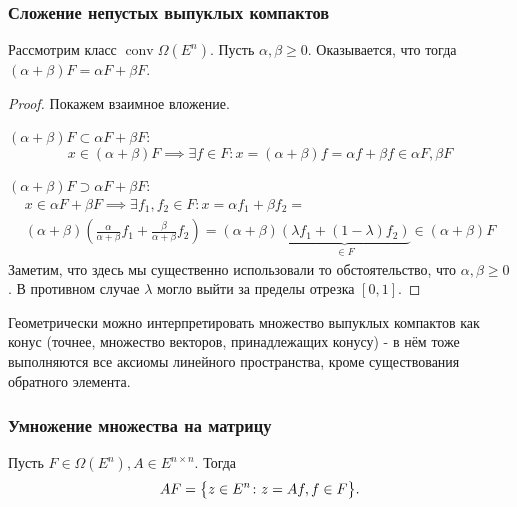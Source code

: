\subsubsection{Сложение непустых выпуклых компактов}
Рассмотрим класс $\operatorname{conv} \Omega(E^n)$.
Пусть $\alpha, \beta \geqslant 0$.
Оказывается, что тогда $(\alpha + \beta) F = \alpha F + \beta F $.

\begin{proof}
    Покажем взаимное вложение.

    $(\alpha + \beta) F \subset \alpha F + \beta F$:
        \begin{equation*}
            x \in (\alpha + \beta) F \implies 
            \exists f \in F\colon 
            x = (\alpha + \beta)f = 
            \alpha f + \beta f \in \alpha F, \beta F
        \end{equation*}

    $(\alpha + \beta) F \supset \alpha F + \beta F$:
        \begin{multline*}
        x \in \alpha F + \beta F \implies
        \exists f_1, f_2 \in F\colon
        x = \alpha f_1 + \beta f_2 = \\
        (\alpha + \beta) \left( \frac{\alpha}{\alpha + \beta} f_1 + \frac{\beta}{\alpha + \beta} f_2\right) =
        (\alpha + \beta)\underbrace{(\lambda f_1 + (1 - \lambda) f_2)}_{\in F} \in (\alpha + \beta) F
        \end{multline*}
    Заметим, что здесь мы существенно использовали то обстоятельство, что $\alpha, \beta \geqslant 0$.
    В противном случае $\lambda$ могло выйти за пределы отрезка $[0, 1]$.
\end{proof}

Геометрически можно интерпретировать множество выпуклых компактов как конус (точнее, множество векторов, принадлежащих конусу) - 
в нём тоже выполняются все аксиомы линейного пространства, кроме существования обратного элемента.

\subsubsection{Умножение множества на матрицу}
\begin{defn}
    Пусть $F \in \Omega(E^{n}), A \in E^{n \times n}$.
    Тогда
    \begin{equation}
        A F = \bigl\{ z \in E^n\colon z = Af, f \in F \bigr\}.
    \end{equation}
\end{defn}

